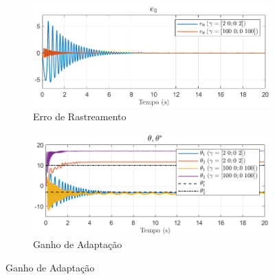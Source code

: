 \documentclass[10pt]{article}
\begin{document}
\begin{figure}[h!]
    \centering
    \begin{subfigure}[b]{0.3\textwidth}
        \centering
        \includegraphics[width=\textwidth]{img/fig08a.png}
        \caption{Erro de Rastreamento}
    \end{subfigure}
    \begin{subfigure}[b]{0.3\textwidth}
        \centering
        \includegraphics[width=\textwidth]{img/fig08b.png}
        \caption{Ganho de Adaptação}
    \end{subfigure}


\end{figure}
\end{document}
